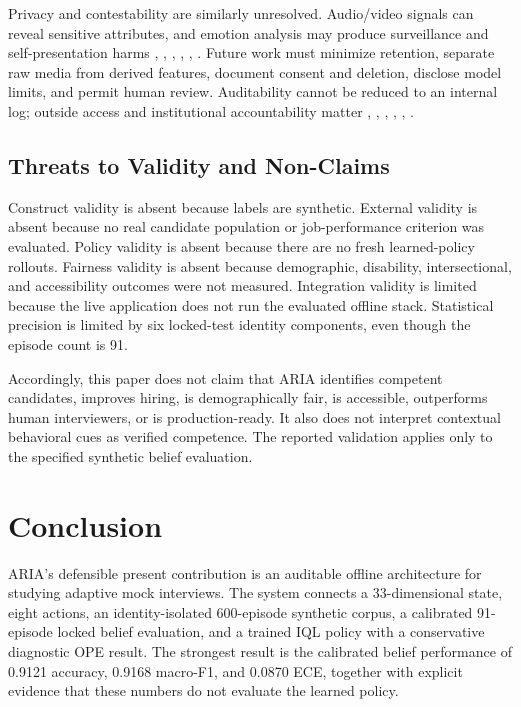 \documentclass[journal]{IEEEtran}
\begin{document}
Privacy and contestability are similarly unresolved. Audio/video signals can reveal sensitive attributes, and emotion analysis may produce surveillance and self-presentation harms \cite{pyle2024justice}, \cite{aizenberg2023autonomy}, \cite{ingber2025emotion}, \cite{roemmich2023values}, \cite{liu2023uncertainty}, \cite{roemmich2023privacy}. Future work must minimize retention, separate raw media from derived features, document consent and deletion, disclose model limits, and permit human review. Auditability cannot be reduced to an internal log; outside access and institutional accountability matter \cite{kazim2021audit}, \cite{wilson2021fairalgorithms}, \cite{mihaljevic2023auditing}, \cite{gerchick2025audits}, \cite{costanzachock2022auditors}, \cite{raji2022oversight}.


\subsection{Threats to Validity and Non-Claims}

Construct validity is absent because labels are synthetic. External validity is absent because no real candidate population or job-performance criterion was evaluated. Policy validity is absent because there are no fresh learned-policy rollouts. Fairness validity is absent because demographic, disability, intersectional, and accessibility outcomes were not measured. Integration validity is limited because the live application does not run the evaluated offline stack. Statistical precision is limited by six locked-test identity components, even though the episode count is 91.


Accordingly, this paper does not claim that ARIA identifies competent candidates, improves hiring, is demographically fair, is accessible, outperforms human interviewers, or is production-ready. It also does not interpret contextual behavioral cues as verified competence. The reported validation applies only to the specified synthetic belief evaluation.


\section{Conclusion}

ARIA's defensible present contribution is an auditable offline architecture for studying adaptive mock interviews. The system connects a 33-dimensional state, eight actions, an identity-isolated 600-episode synthetic corpus, a calibrated 91-episode locked belief evaluation, and a trained IQL policy with a conservative diagnostic OPE result. The strongest result is the calibrated belief performance of 0.9121 accuracy, 0.9168 macro-F1, and 0.0870 ECE, together with explicit evidence that these numbers do not evaluate the learned policy.
\end{document}
